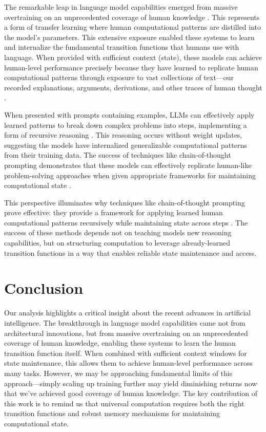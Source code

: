 \documentclass[12pt]{article}
\begin{document}
The remarkable leap in language model capabilities emerged from massive overtraining on an unprecedented coverage of human knowledge \cite{schuurmans2024autoregressive}.
This represents a form of transfer learning where human computational patterns are distilled into the model's parameters.
This extensive exposure enabled these systems to learn and internalize the fundamental transition functions that humans use with language.
When provided with sufficient context (state), these models can achieve human-level performance precisely because they have learned to replicate human computational patterns through exposure to vast collections of text---our recorded explanations, arguments, derivations, and other traces of human thought \cite{brown2020language,wei2022chain}.

When presented with prompts containing examples, LLMs can effectively apply learned patterns to break down complex problems into steps, implementing a form of recursive reasoning \cite{wei2022chain}.
This reasoning occurs without weight updates, suggesting the models have internalized generalizable computational patterns from their training data.
The success of techniques like chain-of-thought prompting demonstrates that these models can effectively replicate human-like problem-solving approaches when given appropriate frameworks for maintaining computational state \cite{wei2022emergent}.

This perspective illuminates why techniques like chain-of-thought prompting prove effective: they provide a framework for applying learned human computational patterns recursively while maintaining state across steps \cite{wei2022chain}.
The success of these methods depends not on teaching models new reasoning capabilities, but on structuring computation to leverage already-learned transition functions in a way that enables reliable state maintenance and access.

\section{Conclusion}

Our analysis highlights a critical insight about the recent advances in artificial intelligence.
The breakthrough in language model capabilities came not from architectural innovations, but from massive overtraining on an unprecedented coverage of human knowledge, enabling these systems to learn the human transition function itself.
When combined with sufficient context windows for state maintenance, this allows them to achieve human-level performance across many tasks.
However, we may be approaching fundamental limits of this approach---simply scaling up training further may yield diminishing returns now that we've achieved good coverage of human knowledge.
The key contribution of this work is to remind us that universal computation requires both the right transition functions and robust memory mechanisms for maintaining computational state.
\end{document}
